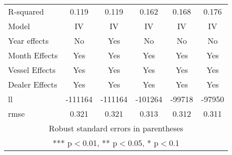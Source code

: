 \begin{tabular}{lccccc}
R-squared & 0.119 & 0.119 & 0.162 & 0.168 & 0.176 \\
Model & IV & IV & IV & IV & IV \\
Year effects & No & Yes & No & No & No \\
Month Effects & Yes & Yes & Yes & Yes & Yes \\
Vessel Effects & Yes & Yes & Yes & Yes & Yes \\
Dealer Effects & Yes & Yes & Yes & Yes & Yes \\
ll & -111164 & -111164 & -101264 & -99718 & -97950 \\
 rmse & 0.321 & 0.321 & 0.313 & 0.312 & 0.311 \\ \hline
\multicolumn{6}{c}{ Robust standard errors in parentheses} \\
\multicolumn{6}{c}{ *** p$<$0.01, ** p$<$0.05, * p$<$0.1} \\
\end{tabular}
